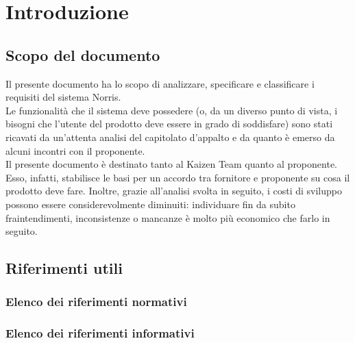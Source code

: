 \section{Introduzione}

	\subsection{Scopo del documento}
		Il presente documento ha lo scopo di analizzare, specificare e classificare i requisiti del sistema Norris.\\
		Le funzionalità che il sistema deve possedere (o, da un diverso punto di vista, i bisogni che l'utente del prodotto deve essere in grado di soddisfare) sono stati ricavati da un'attenta analisi del capitolato d'appalto e da quanto è emerso da alcuni incontri con il proponente.\\
		Il presente documento è destinato tanto al Kaizen Team quanto al proponente. Esso, infatti, stabilisce le basi per un accordo tra fornitore e proponente su cosa il prodotto deve fare. Inoltre, grazie all'analisi svolta in seguito, i costi di sviluppo possono essere considerevolmente diminuiti: individuare fin da subito fraintendimenti, inconsistenze o mancanze è molto più economico che farlo in seguito.
	
	

	\subsection{Riferimenti utili}
		\subsubsection{Elenco dei riferimenti normativi}
		\subsubsection{Elenco dei riferimenti informativi}
